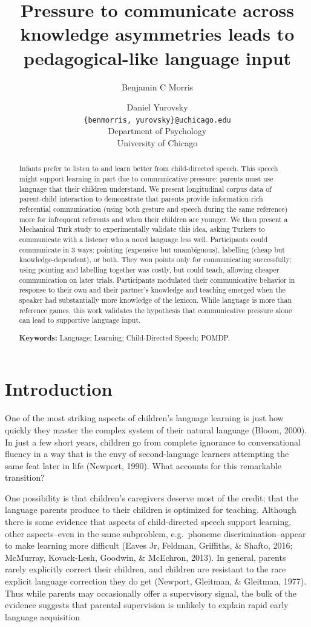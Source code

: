 \documentclass[10pt, letterpaper]{article}
\title{Pressure to communicate across knowledge asymmetries leads to
pedagogical-like language input}
\author{Benjamin C Morris \and Daniel Yurovsky \\
        \texttt{\{benmorris, yurovsky\}@uchicago.edu} \\
       Department of Psychology \\ University of Chicago}
\begin{document}
\maketitle

\begin{abstract}
Infants prefer to listen to and learn better from child-directed speech.
This speech might support learning in part due to communicative
pressure: parents must use language that their children understand. We
present longitudinal corpus data of parent-child interaction to
demonstrate that parents provide information-rich referential
communication (using both gesture and speech during the same reference)
more for infrequent referents and when their children are younger. We
then present a Mechanical Turk study to experimentally validate this
idea, asking Turkers to communicate with a listener who a novel language
less well. Participants could communicate in 3 ways: pointing (expensive
but unambiguous), labelling (cheap but knowledge-dependent), or both.
They won points only for communicating successfully; using pointing and
labelling together was costly, but could teach, allowing cheaper
communication on later trials. Participants modulated their
communicative behavior in response to their own and their partner's
knowledge and teaching emerged when the speaker had substantially more
knowledge of the lexicon. While language is more than reference games,
this work validates the hypothesis that communicative pressure alone can
lead to supportive language input.

\textbf{Keywords:}
Language; Learning; Child-Directed Speech; POMDP.
\end{abstract}

\hypertarget{introduction}{%
\section{Introduction}\label{introduction}}

One of the most striking aspects of children's language learning is just
how quickly they master the complex system of their natural language
(Bloom, 2000). In just a few short years, children go from complete
ignorance to conversational fluency in a way that is the envy of
second-language learners attempting the same feat later in life
(Newport, 1990). What accounts for this remarkable transition?

One possibility is that children's caregivers deserve most of the
credit; that the language parents produce to their children is optimized
for teaching. Although there is some evidence that aspects of
child-directed speech support learning, other aspects--even in the same
subproblem, e.g.~phoneme discrimination--appear to make learning more
difficult (Eaves Jr, Feldman, Griffiths, \& Shafto, 2016; McMurray,
Kovack-Lesh, Goodwin, \& McEchron, 2013). In general, parents rarely
explicitly correct their children, and children are resistant to the
rare explicit language correction they do get (Newport, Gleitman, \&
Gleitman, 1977). Thus while parents may occasionally offer a supervisory
signal, the bulk of the evidence suggests that parental supervision is
unlikely to explain rapid early language acquisition
\end{document}
